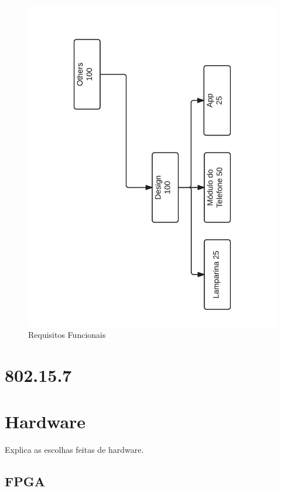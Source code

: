 	\begin{figure}[htb]
		\caption{\label{fig_req3} Requisitos Funcionais }
		\centering
		\includegraphics[width=1.0\textwidth, trim={1cm 1cm 1cm 1cm}, clip]{ReqTree3.pdf}
	\end{figure}
	
	
	\section{802.15.7}\label{sec-norma}
	
	
	
	\section{Hardware}\label{sec-hardware}
	
	Explica as escolhas feitas de hardware.
	
	\subsection{FPGA}\label{hard-fpga}
	
